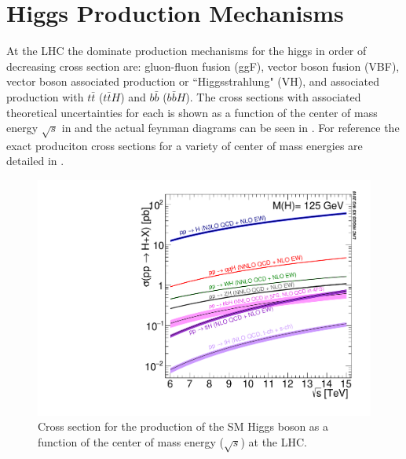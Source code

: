 \section{Higgs Production Mechanisms} \label{sec:higgs:production}

At the LHC the dominate production mechanisms for the higgs in order of
decreasing cross section are: gluon-fluon fusion (ggF), vector boson fusion
(VBF), vector boson associated production or ``Higgsstrahlung" (VH), and
associated production with $t\bar{t}$ ($t\bar{t}H$) and $b\bar{b}$
($b\bar{b}H$).  The cross sections with associated theoretical uncertainties for
each is shown as a function of the center of mass energy $\sqrt{s}$ in
 and the actual feynman diagrams can be seen in
.  For reference the exact produciton cross sections
for a variety of center of mass energies are detailed in .

\begin{figure}[!htbp]
  \begin{center}
    \includegraphics[width=0.5\linewidth]{figures/higgs/higgs_xsection.pdf}
    \caption{ Cross section for the production of the SM Higgs boson as a
function of the center of mass energy ($\sqrt{s}$) at the LHC. \cite{PDG2018:Ch11}}
    \label{fig:higgs_xsection}
  \end{center}
\end{figure}

